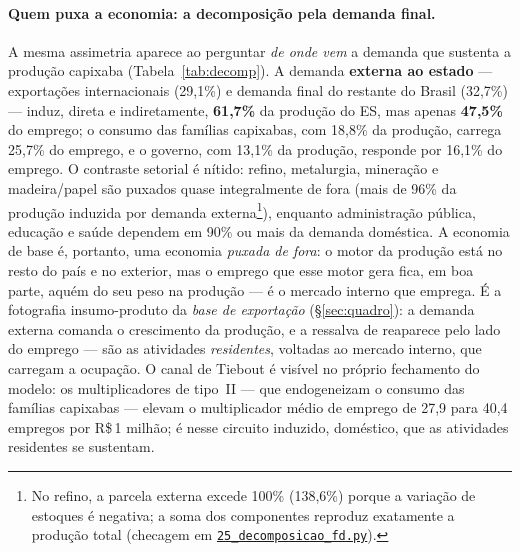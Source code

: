 \documentclass[11pt,a4paper]{article}
\begin{document}
\paragraph{Quem puxa a economia: a decomposição pela demanda final.}
A mesma assimetria aparece ao perguntar \emph{de onde vem} a demanda que sustenta a
produção capixaba (Tabela~\ref{tab:decomp}). A demanda \textbf{externa ao estado}
--- exportações internacionais (29,1\%) e demanda final do restante do Brasil (32,7\%)
--- induz, direta e indiretamente, \textbf{61,7\%} da produção do ES, mas apenas
\textbf{47,5\%} do emprego; o consumo das famílias capixabas, com 18,8\% da produção,
carrega 25,7\% do emprego, e o governo, com 13,1\% da produção, responde por 16,1\% do
emprego. O contraste setorial é nítido: refino, metalurgia, mineração e madeira/papel são
puxados quase integralmente de fora (mais de 96\% da produção induzida por demanda
externa\footnote{No refino, a parcela externa excede 100\% (138,6\%) porque a variação de
estoques é negativa; a soma dos componentes reproduz exatamente a produção total (checagem em
\href{https://github.com/fcarva/es-insumo-produto/blob/116a350/pesquisa/25_decomposicao_fd.py}{\texttt{25\_decomposicao\_fd.py}}).}),
enquanto administração pública, educação e saúde dependem em 90\% ou mais da demanda
doméstica. A economia de base é, portanto, uma economia \emph{puxada de fora}: o motor da
produção está no resto do país e no exterior, mas o emprego que esse motor gera fica, em boa
parte, aquém do seu peso na produção --- é o mercado interno que emprega. É a fotografia
insumo-produto da \emph{base de exportação} (\S\ref{sec:quadro}): a demanda externa comanda o
crescimento da produção, e a ressalva de \citet{tiebout1956} reaparece pelo lado do emprego ---
são as atividades \emph{residentes}, voltadas ao mercado interno, que carregam a ocupação. O
canal de Tiebout é visível no próprio fechamento do modelo: os multiplicadores de tipo~II ---
que endogeneizam o consumo das famílias capixabas --- elevam o multiplicador médio de emprego
de 27,9 para 40,4 empregos por R\$\,1 milhão; é nesse circuito induzido, doméstico, que as
atividades residentes se sustentam.
\end{document}
